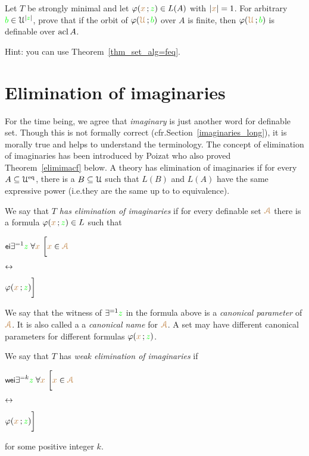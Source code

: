 \documentclass[creche.tex]{subfiles}
\begin{document}
\begin{exercise}
Let $T$ be strongly minimal and let $\varphi({\color{brown} x}\,;{\color{green} z})\in L(A)$ with $|{\color{brown} x}|=1$.
For arbitrary ${\color{green} b}\in\EuScript U^{|{\color{green} z}|}$, prove that if the orbit of $\varphi({\color{brown}\EuScript U}\,; {\color{green} b})$ over $A$ is finite, then $\varphi({\color{brown}\EuScript U}\,; {\color{green} b})$ is definable over $\mathop{\rm acl} A$.

Hint: you can use Theorem~\ref{thm_set_alg=feq}.\QED
\end{exercise}


\section{Elimination of imaginaries}\label{elimination_imaginaries}

\def\medrel#1{\parbox[t]{5ex}{$\displaystyle\hfil #1$}}
\def\ceq#1#2#3{\parbox[t]{30ex}{$\displaystyle #1$}\medrel{#2}{$\displaystyle #3$}}

For the time being, we agree that \textit{imaginary\/} is just another word for definable set.
Though this is not formally correct (cfr.\@ Section~\ref{imaginaries_long}), it is morally true and helps to understand the terminology.
The concept of elimination of imaginaries has been introduced by Poizat who also proved Theorem~\ref{elimimacf} below.
A theory has elimination of imaginaries if for every $A\subseteq\EuScript U^{{\rm eq}}$, there is a $B\subseteq\EuScript U$ such that $L(B)$ and $L(A)$ have the same expressive power (i.e.\@ they are the same up to to equivalence).


\begin{definition}\label{defelimanazioneimmaginari}
We say that \emph{$T$ has elimination of imaginaries\/} if for every definable set ${\color{brown}\EuScript A}$ there is a formula $\varphi({\color{brown} x}\,;{\color{green} z})\in L$ such that\smallskip

\ceq{\ssf{ei}\hfill\E^{=1} {\gr z}\;\A {\mr x}\ \bigg[{\mr x}\in{\vl\Aa}}{\iff}{\phi({\mr x}\,;{\gr z})\bigg]}

We say that the witness of $\exists^{=1}{\color{green} z}$ in the formula above is a \emph{canonical parameter\/} of ${\color{brown}\EuScript A}$.
It is also called a a \emph{canonical name\/} for ${\color{brown}\EuScript A}$.
A set may have different canonical parameters for different formulas $\varphi({\color{brown} x}\,;{\color{green} z})$.

We say that $T$ has \emph{weak elimination of imaginaries\/} if\smallskip

\ceq{\ssf{wei}\hfill\E^{=k} {\gr z}\;\A {\mr x}\ \bigg[{\mr x}\in{\vl\Aa}}{\iff}{\phi({\mr x}\,;{\gr z})\bigg]}

for some positive integer $k$.\QED
\end{definition}
\end{document}
